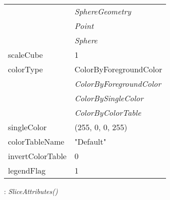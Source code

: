 \documentclass[10pt,a4paper]{report}
\begin{document}
\begin{longtable}{ll}
 & {\it  SphereGeometry} \\
 & {\it  Point} \\
 & {\it  Sphere} \\
scaleCube  &  1 \\
colorType  &  ColorByForegroundColor   \\
 & {\it  ColorByForegroundColor} \\
 & {\it  ColorBySingleColor} \\
 & {\it  ColorByColorTable} \\
singleColor  &  (255, 0, 0, 255) \\
colorTableName  &  "Default" \\
invertColorTable  &  0 \\
legendFlag  &  1 \\
\end{longtable}

\newpage

{}
: {\it SliceAttributes() }\\[-3mm]
\end{document}
